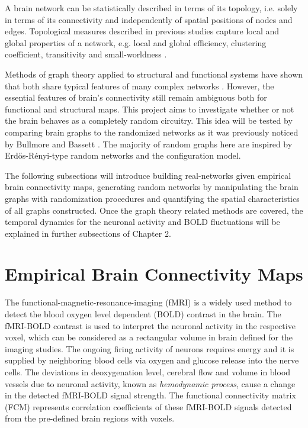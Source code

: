A brain network can be statistically described in terms of its topology, i.e. solely in terms of its connectivity and independently of spatial positions of nodes and edges. Topological measures described in previous studies capture local and global properties of a network, e.g. local and global efficiency, clustering coefficient, transitivity and small-worldness \citep{LAT01, WAT98, NEW03, HUM08}.


Methods of graph theory applied to structural and functional systems have shown that both share typical features of many complex networks \citep{BUL09, RUB09, HEU11, VUK14}. However, the essential features of brain's connectivity still remain ambiguous both for functional and structural maps. This project aims to investigate whether or not the brain behaves as a completely random circuitry. This idea will be tested by comparing brain graphs to the randomized networks as it was previously noticed by Bullmore and Bassett \citep{BUL11a}. The majority of random graphs here are inspired by  Erd\H{o}s-R\'{e}nyi-type random networks and the configuration model. 
 

The following subsections will introduce building real-networks given empirical brain connectivity maps, generating random networks by manipulating the brain graphs with randomization procedures and quantifying the spatial characteristics of all graphs constructed. Once the graph theory related methods are covered, the temporal dynamics for the neuronal activity and BOLD fluctuations will be explained in further subsections of Chapter 2. 



\section{Empirical Brain Connectivity Maps}

The functional-magnetic-resonance-imaging (fMRI) is a widely used method to detect the blood oxygen level dependent (BOLD) contrast in the brain. The fMRI-BOLD contrast is used to interpret the neuronal activity in the respective voxel, which can be considered as a rectangular volume in brain defined for the imaging studies. The ongoing firing activity of neurons requires energy and it is supplied by neighboring blood cells via oxygen and glucose release into the nerve cells. The deviations in deoxygenation level, cerebral flow and volume in blood vessels due to neuronal activity, known as \textit{hemodynamic process}, cause a change in the detected fMRI-BOLD signal strength. The functional connectivity matrix (FCM) represents correlation coefficients of these fMRI-BOLD signals detected from the pre-defined brain regions with voxels. 

